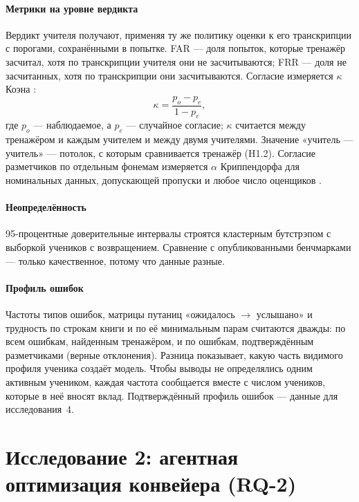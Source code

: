 \paragraph{Метрики на уровне вердикта} Вердикт учителя получают, применяя ту же политику оценки к его
транскрипции с порогами, сохранёнными в попытке. FAR --- доля попыток, которые тренажёр засчитал, хотя по
транскрипции учителя они не засчитываются; FRR --- доля не засчитанных, хотя по транскрипции они
засчитываются. Согласие измеряется $\kappa$ Коэна \cite{SRC-104}:
\begin{equation}
  \kappa = \frac{p_o - p_e}{1 - p_e},
\end{equation}
где $p_o$ --- наблюдаемое, а $p_e$ --- случайное согласие; $\kappa$ считается между тренажёром и каждым
учителем и между двумя учителями. Значение «учитель --- учитель» --- потолок, с которым сравнивается
тренажёр (H1.2). Согласие разметчиков по отдельным фонемам измеряется $\alpha$ Криппендорфа для
номинальных данных, допускающей пропуски и любое число оценщиков \cite{SRC-065}.

\paragraph{Неопределённость} 95-процентные доверительные интервалы строятся кластерным бутстрэпом с
выборкой учеников с возвращением. Сравнение с опубликованными бенчмарками --- только качественное, потому
что данные разные.

\paragraph{Профиль ошибок} Частоты типов ошибок, матрицы путаниц «ожидалось $\to$ услышано» и трудность
по строкам книги и по её минимальным парам считаются дважды: по всем ошибкам, найденным тренажёром, и по
ошибкам, подтверждённым разметчиками (верные отклонения). Разница показывает, какую часть видимого профиля
ученика создаёт модель. Чтобы выводы не определялись одним активным учеником, каждая частота сообщается
вместе с числом учеников, которые в неё вносят вклад. Подтверждённый профиль ошибок --- данные для
исследования~4.

\section{Исследование 2: агентная оптимизация конвейера (RQ-2)}\label{sec:method-s2}

